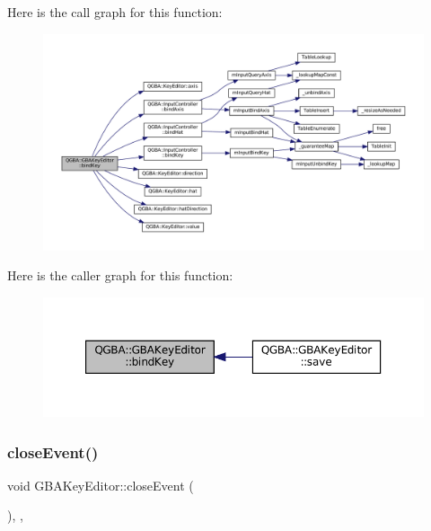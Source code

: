 Here is the call graph for this function\+:
\nopagebreak
\begin{figure}[H]
\begin{center}
\leavevmode
\includegraphics[width=350pt]{class_q_g_b_a_1_1_g_b_a_key_editor_a7cba79624d45ce9284f6675447504e9a_cgraph}
\end{center}
\end{figure}
Here is the caller graph for this function\+:
\nopagebreak
\begin{figure}[H]
\begin{center}
\leavevmode
\includegraphics[width=350pt]{class_q_g_b_a_1_1_g_b_a_key_editor_a7cba79624d45ce9284f6675447504e9a_icgraph}
\end{center}
\end{figure}
\mbox{\label{class_q_g_b_a_1_1_g_b_a_key_editor_ab0aa3144558fdbc605a8dd04939dd670}} 
\subsubsection{\texorpdfstring{close\+Event()}{closeEvent()}}
{\footnotesize\ttfamily void G\+B\+A\+Key\+Editor\+::close\+Event (\begin{DoxyParamCaption}\item[{Q\+Close\+Event $\ast$}]{ }\end{DoxyParamCaption})\hspace{0.3cm}{\ttfamily [override]}, {\ttfamily [protected]}, {\ttfamily [virtual]}}


